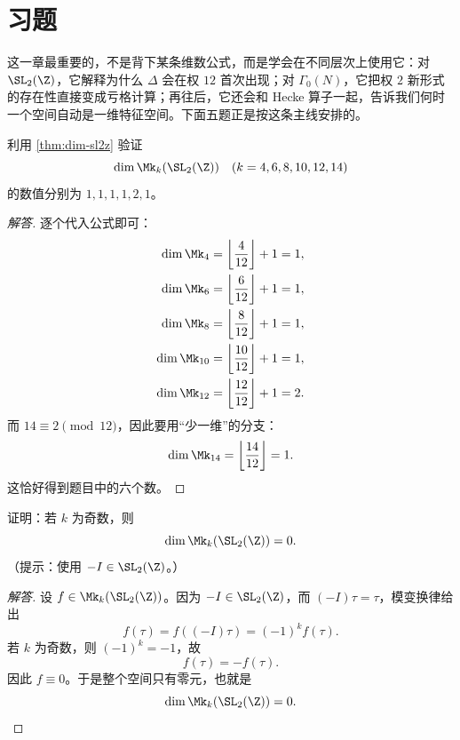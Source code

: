 \section{习题}
\label{sec:dim-exercises}

这一章最重要的，不是背下某条维数公式，而是学会在不同层次上使用它：对 $\SL_2(\Z)$，它解释为什么 $\Delta$ 会在权 $12$ 首次出现；对 $\Gamma_0(N)$，它把权 $2$ 新形式的存在性直接变成亏格计算；再往后，它还会和 Hecke 算子一起，告诉我们何时一个空间自动是一维特征空间。下面五题正是按这条主线安排的。



\begin{exercise}
\label{ex:dim-formula-small-k}
利用 \cref{thm:dim-sl2z} 验证
\[
  \dim \Mk_k(\SL_2(\Z))
  \quad (k=4,6,8,10,12,14)
\]
的数值分别为 $1,1,1,1,2,1$。
\end{exercise}

\begin{proof}[解答]
逐个代入公式即可：
\begin{align*}
  \dim \Mk_4&=\left\lfloor\frac{4}{12}\right\rfloor+1=1,\\
  \dim \Mk_6&=\left\lfloor\frac{6}{12}\right\rfloor+1=1,\\
  \dim \Mk_8&=\left\lfloor\frac{8}{12}\right\rfloor+1=1,\\
  \dim \Mk_{10}&=\left\lfloor\frac{10}{12}\right\rfloor+1=1,\\
  \dim \Mk_{12}&=\left\lfloor\frac{12}{12}\right\rfloor+1=2.
\end{align*}
而 $14\equiv 2\pmod{12}$，因此要用“少一维”的分支：
\[
  \dim \Mk_{14}=\left\lfloor\frac{14}{12}\right\rfloor=1.
\]
这恰好得到题目中的六个数。
\end{proof}

\begin{exercise}
\label{ex:odd-weight-zero}
证明：若 $k$ 为奇数，则
\[
  \dim \Mk_k(\SL_2(\Z))=0.
\]
（提示：使用 $-I\in \SL_2(\Z)$。）
\end{exercise}

\begin{proof}[解答]
设 $f\in \Mk_k(\SL_2(\Z))$。因为 $-I\in \SL_2(\Z)$，而 $(-I)\tau=\tau$，模变换律给出
\[
  f(\tau)=f((-I)\tau)=(-1)^k f(\tau).
\]
若 $k$ 为奇数，则 $(-1)^k=-1$，故
\[
  f(\tau)=-f(\tau).
\]
因此 $f\equiv 0$。于是整个空间只有零元，也就是
\[
  \dim \Mk_k(\SL_2(\Z))=0.
\]
\end{proof}

